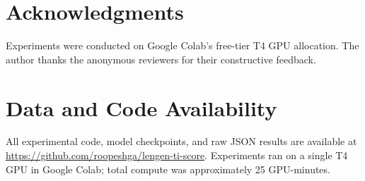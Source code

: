 \documentclass[10pt,twocolumn]{article}
\begin{document}
\section*{Acknowledgments}
Experiments were conducted on Google Colab's free-tier T4 GPU allocation.
The author thanks the anonymous reviewers for their constructive feedback.

\section*{Data and Code Availability}
All experimental code, model checkpoints, and raw JSON results are available at \url{https://github.com/roopeshga/lengen-ti-score}.
Experiments ran on a single T4 GPU in Google Colab; total compute was approximately 25 GPU-minutes.



\end{document}
